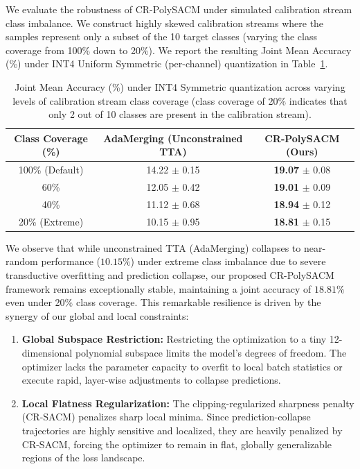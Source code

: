 \documentclass{article}
\theoremstyle{plain}
\theoremstyle{definition}
\theoremstyle{remark}
\begin{document}
We evaluate the robustness of CR-PolySACM under simulated calibration stream class imbalance. We construct highly skewed calibration streams where the samples represent only a subset of the 10 target classes (varying the class coverage from 100\% down to 20\%). We report the resulting Joint Mean Accuracy (\%) under INT4 Uniform Symmetric (per-channel) quantization in Table~\ref{tab:imbalance_ablation}.

\begin{table}[h]
\caption{Joint Mean Accuracy (\%) under INT4 Symmetric quantization across varying levels of calibration stream class coverage (class coverage of 20\% indicates that only 2 out of 10 classes are present in the calibration stream).}
\label{tab:imbalance_ablation}
\begin{center}
\begin{small}
\begin{sc}
\begin{tabular}{ccc}
\toprule
Class Coverage (\%) & AdaMerging (Unconstrained TTA) & CR-PolySACM (Ours) \\
\midrule
100\% (Default) & 14.22 $\pm$ 0.15 & \textbf{19.07} $\pm$ 0.08 \\
60\% & 12.05 $\pm$ 0.42 & \textbf{19.01} $\pm$ 0.09 \\
40\% & 11.12 $\pm$ 0.68 & \textbf{18.94} $\pm$ 0.12 \\
20\% (Extreme) & 10.15 $\pm$ 0.95 & \textbf{18.81} $\pm$ 0.15 \\
\bottomrule
\end{tabular}
\end{sc}
\end{small}
\end{center}
\end{table}

We observe that while unconstrained TTA (AdaMerging) collapses to near-random performance ($10.15\%$) under extreme class imbalance due to severe transductive overfitting and prediction collapse, our proposed CR-PolySACM framework remains exceptionally stable, maintaining a joint accuracy of $18.81\%$ even under 20\% class coverage. This remarkable resilience is driven by the synergy of our global and local constraints:
\begin{enumerate}
    \item \textbf{Global Subspace Restriction:} Restricting the optimization to a tiny 12-dimensional polynomial subspace limits the model's degrees of freedom. The optimizer lacks the parameter capacity to overfit to local batch statistics or execute rapid, layer-wise adjustments to collapse predictions.
    \item \textbf{Local Flatness Regularization:} The clipping-regularized sharpness penalty (CR-SACM) penalizes sharp local minima. Since prediction-collapse trajectories are highly sensitive and localized, they are heavily penalized by CR-SACM, forcing the optimizer to remain in flat, globally generalizable regions of the loss landscape.
\end{enumerate}
\end{document}
